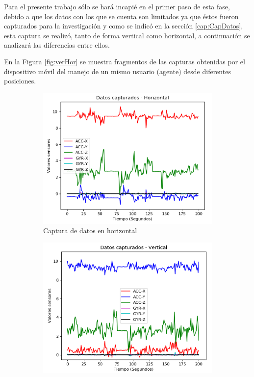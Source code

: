 Para el presente trabajo s\'{o}lo se har\'{a} incapi\'{e} en el primer paso de esta fase, debido a que los datos con los que se cuenta son limitados ya que \'{e}stos fueron capturados para la investigaci\'{o}n y como se indic\'{o} en la secci\'{o}n \ref{cap:CapDatos}, esta captura se realiz\'{o}, tanto de forma vertical como horizontal, a continuaci\'{o}n se analizar\'{a} las diferencias entre ellos.

\vspace{5mm} %

En la Figura \ref{fig:verHor} se muestra fragmentos de las capturas obtenidas por el dispositivo m\'{o}vil del manejo de un mismo usuario (agente) desde diferentes posiciones.

\begin{figure}
        \centering
        \begin{subfigure}[h]{0.47\textwidth} 
            \includegraphics[width=\textwidth]{imagenes/Cap3/horizontal}
            \caption{Captura de datos en horizontal}
            \label{fig:hor}
        \end{subfigure}       
        \begin{subfigure}[h]{0.47\textwidth} 
            \includegraphics[width=\textwidth]{imagenes/Cap3/vertical}

\end{subfigure}
\end{figure}
